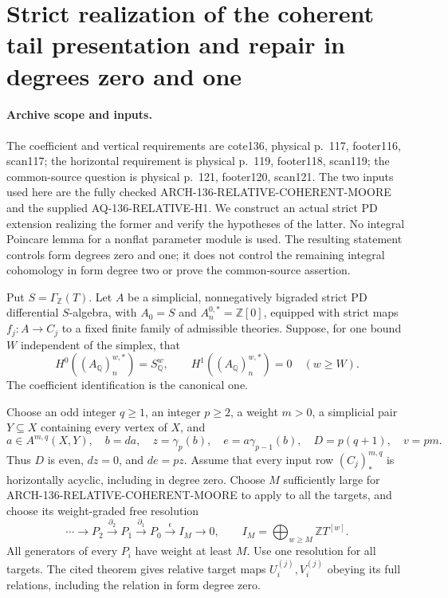 \section{Strict realization of the coherent tail presentation and repair in degrees zero and one}
\label{sec:136-coherent-pd-realization}

\paragraph{Archive scope and inputs.}
The coefficient and vertical requirements are cote136, physical
p.~117, footer116, scan117; the horizontal requirement is physical
p.~119, footer118, scan119; the common-source question is physical
p.~121, footer120, scan121. The two inputs used here are the fully
checked ARCH-136-RELATIVE-COHERENT-MOORE and the supplied
AQ-136-RELATIVE-H1. We construct an actual strict PD extension
realizing the former and verify the hypotheses of the latter.
No integral Poincare lemma for a nonflat parameter module is used.
The resulting statement controls form degrees zero and one; it
does not control the remaining integral cohomology in form degree
two or prove the common-source assertion.

Put \(S=\Gamma_{\mathbb Z}(T)\). Let \(A\) be a simplicial,
nonnegatively bigraded strict PD differential \(S\)-algebra,
with \(A_0=S\) and \(A_n^{0,*}=\mathbb Z[0]\), equipped with
strict maps \(f_j:A\to C_j\) to a fixed finite family of
admissible theories. Suppose, for one bound \(W\) independent
of the simplex, that
\[
 H^0((A_{\mathbb Q})_n^{w,*})=S_{\mathbb Q}^w,
 \qquad H^1((A_{\mathbb Q})_n^{w,*})=0
                       \quad(w\geq W).                 \tag{136.CP1}
\]
The coefficient identification is the canonical one.

Choose an odd integer \(q\geq1\), an integer \(p\geq2\),
a weight \(m>0\), a simplicial pair \(Y\subseteq X\)
containing every vertex of \(X\), and
\[
 a\in A^{m,q}(X,Y),\quad b=da,\quad
 z=\gamma_p(b),\quad e=a\gamma_{p-1}(b),\quad
 D=p(q+1),\quad v=pm.                                  \tag{136.CP2}
\]
Thus \(D\) is even, \(dz=0\), and \(de=pz\).
Assume that every input row \((C_j)_*^{m,q}\) is horizontally
acyclic, including in degree zero. Choose \(M\) sufficiently
large for ARCH-136-RELATIVE-COHERENT-MOORE to apply to all the
targets, and choose its weight-graded free resolution
\[
 \cdots\longrightarrow P_2\xrightarrow{\partial_2}P_1
 \xrightarrow{\partial_1}P_0\xrightarrow{\epsilon}I_M
 \longrightarrow0,\qquad
 I_M=\bigoplus_{w\geq M}\mathbb ZT^{[w]}.                \tag{136.CP3}
\]
All generators of every \(P_i\) have weight at least \(M\).
Use one resolution for all targets. The cited theorem gives
relative target maps \(U_i^{(j)},V_i^{(j)}\) obeying its full
relations, including the relation in form degree zero.

